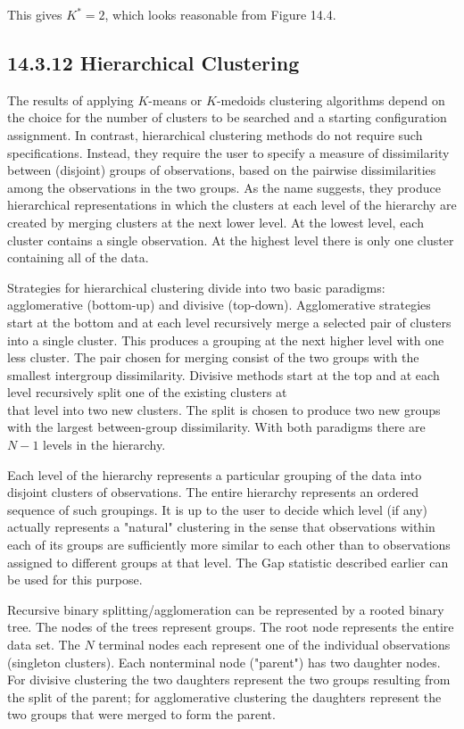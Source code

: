 \documentclass[10pt]{article}
\begin{document}
This gives $K^{*}=2$, which looks reasonable from Figure 14.4.

\subsection*{14.3.12 Hierarchical Clustering}
The results of applying $K$-means or $K$-medoids clustering algorithms depend on the choice for the number of clusters to be searched and a starting configuration assignment. In contrast, hierarchical clustering methods do not require such specifications. Instead, they require the user to specify a measure of dissimilarity between (disjoint) groups of observations, based on the pairwise dissimilarities among the observations in the two groups. As the name suggests, they produce hierarchical representations in which the clusters at each level of the hierarchy are created by merging clusters at the next lower level. At the lowest level, each cluster contains a single observation. At the highest level there is only one cluster containing all of the data.

Strategies for hierarchical clustering divide into two basic paradigms: agglomerative (bottom-up) and divisive (top-down). Agglomerative strategies start at the bottom and at each level recursively merge a selected pair of clusters into a single cluster. This produces a grouping at the next higher level with one less cluster. The pair chosen for merging consist of the two groups with the smallest intergroup dissimilarity. Divisive methods start at the top and at each level recursively split one of the existing clusters at\\
that level into two new clusters. The split is chosen to produce two new groups with the largest between-group dissimilarity. With both paradigms there are $N-1$ levels in the hierarchy.

Each level of the hierarchy represents a particular grouping of the data into disjoint clusters of observations. The entire hierarchy represents an ordered sequence of such groupings. It is up to the user to decide which level (if any) actually represents a "natural" clustering in the sense that observations within each of its groups are sufficiently more similar to each other than to observations assigned to different groups at that level. The Gap statistic described earlier can be used for this purpose.

Recursive binary splitting/agglomeration can be represented by a rooted binary tree. The nodes of the trees represent groups. The root node represents the entire data set. The $N$ terminal nodes each represent one of the individual observations (singleton clusters). Each nonterminal node ("parent") has two daughter nodes. For divisive clustering the two daughters represent the two groups resulting from the split of the parent; for agglomerative clustering the daughters represent the two groups that were merged to form the parent.
\end{document}
